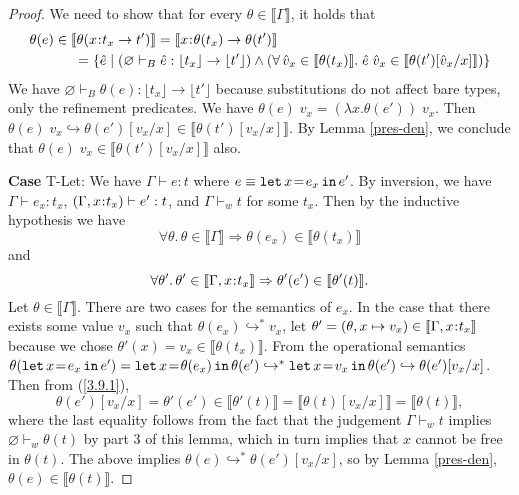 \documentclass[11pt]{article}
\newcommand{\bind}{\hspace{0.05em}{:}\hspace{0.05em}} %
\newcommand{\lb}{\llbracket}         %
\newcommand{\rb}{\rrbracket}         %
\newcommand{\step}{\hookrightarrow}
\newcommand{\many}{\hookrightarrow^*}
\newcommand{\functype}[3]{#1\bind #2 \rightarrow #3}
\newcommand{\foralltheta}{\forall\theta.\,\theta\in\lb\Gamma\rb}
\newcommand{\letin}[3]{{\tt let}\,#1\hspace{0.1em}{=}\hspace{0.1em}#2\,{\tt in}\,#3}
\begin{document}
\begin{proof}
We need to show that for every $\theta \in \lb\Gamma\rb$, it holds that 
\begin{align*}
\theta(e) \in \lb \theta(&\functype{x}{t_x}{t'}) \rb = \lb \functype{x}{\theta(t_x)}{\theta(t')}\rb\\
=&\; \{ \hat{e} \;|\; (\varnothing \vdash_B {\hat e} : \lfloor t_x \rfloor \rightarrow \lfloor t' \rfloor) \wedge ( \forall\, \hat v_x \in \lb \theta(t_x) \rb.\; \hat e \; \hat v_x \in \lb\theta(t')[\hat v_x/x] \rb) \}
\end{align*}
We have $\varnothing \vdash_B \theta(e) : \lfloor t_x \rfloor \rightarrow \lfloor t' \rfloor$ because substitutions do not affect bare types, only the refinement predicates.
We have
$\theta(e)\; v_x = (\lambda x.\theta(e'))\; v_x.$
Then  $\theta(e)\; v_x \step \theta(e')[v_x/x] \in \lb \theta(t')[v_x/x]\rb$. By Lemma \ref{pres-den}, we conclude that $\theta(e)\; v_x \in \lb \theta(t')[v_x/x]\rb$ also.



{\bf Case} {\sc T-Let}: We have $\Gamma \vdash e : t$ where
$e \equiv \letin{x}{e_x}{e'}$.
By inversion, we have $\Gamma \vdash e_x : t_x$,\; $(\Gamma,x\bind t_x) \vdash e' : t$, and $\Gamma \vdash_w t$
for some $t_x$. Then by the inductive hypothesis we have
\[
\foralltheta \Rightarrow \theta(e_x) \in \lb\theta(t_x)\rb
\] and 
\begin{equation}\label{3.9.1}
\forall\theta'.\, \theta' \in \lb\Gamma,x\bind t_x\rb \Rightarrow \theta'(e') \in \lb\theta'(t)\rb.\end{equation}
Let $\theta \in \lb\Gamma\rb$. There are two cases for the semantics of $e_x$. In the case that there exists some value $v_x$ such that $\theta(e_x) \many v_x$, let $\theta' = (\theta, x\mapsto v_x)\in \lb\Gamma,x\bind t_x\rb$ because we chose $\theta'(x) = v_x \in \lb\theta(t_x)\rb$. 
From the operational semantics $\theta(\letin{x}{e_x}{e'}) = \letin{x}{\theta(e_x)}{\theta(e')} \many \letin{x}{v_x}{\theta(e')} \step \theta(e')[v_x/x]$. 
Then from (\ref{3.9.1}),
\[
\theta(e')[v_x/x] = \theta'(e') \in \lb\theta'(t)\rb = \lb\theta(t)[v_x/x]\rb = \lb\theta(t)\rb,
\]
where the last equality follows from the fact that the judgement $\Gamma \vdash_w t$ implies $\varnothing \vdash_w \theta(t)$ by part 3 of this lemma, which in turn implies that $x$ cannot be free in $\theta(t)$.
The above implies
$\theta(e) \many \theta(e')[v_x/x]$, so by Lemma \ref{pres-den}, $\theta(e) \in \lb\theta(t)\rb$.


\end{proof}
\end{document}
